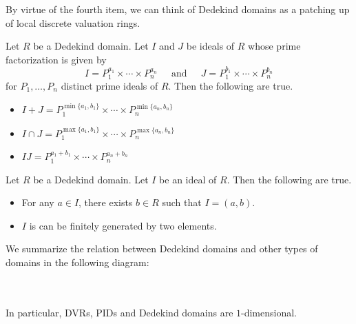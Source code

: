 \documentclass[a4paper]{article}
\begin{document}
By virtue of the fourth item, we can think of Dedekind domains as a patching up of local discrete valuation rings. 

\begin{prp}{}{} Let $R$ be a Dedekind domain. Let $I$ and $J$ be ideals of $R$ whose prime factorization is given by $$I=P_1^{a_1}\times\cdots\times P_n^{a_n}\;\;\;\;\text{ and }\;\;\;\;J=P_1^{b_1}\times\cdots\times P_n^{b_n}$$ for $P_1,\dots,P_n$ distinct prime ideals of $R$. Then the following are true. 
\begin{itemize}
\item $I+J=P_1^{\min\{a_1,b_1\}}\times\cdots\times P_n^{\min\{a_n,b_n\}}$
\item $I\cap J=P_1^{\max\{a_1,b_1\}}\times\cdots\times P_n^{\max\{a_n,b_n\}}$
\item $IJ=P_1^{a_1+b_1}\times\cdots\times P_n^{a_n+b_n}$
\end{itemize}
\end{prp}

\begin{prp}{}{} Let $R$ be a Dedekind domain. Let $I$ be an ideal of $R$. Then the following are true. 
\begin{itemize}
\item For any $a\in I$, there exists $b\in R$ such that $I=(a,b)$. 
\item $I$ is can be finitely generated by two elements. 
\end{itemize}
\end{prp}



We summarize the relation between Dedekind domains and other types of domains in the following diagram: 

 \\~\\

In particular, DVRs, PIDs and Dedekind domains are $1$-dimensional. 
\end{document}
